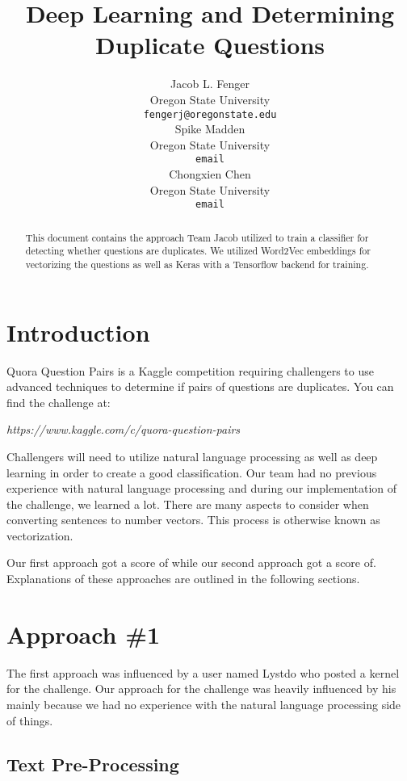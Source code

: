 \documentclass{article}
\title{Deep Learning and Determining Duplicate Questions}
\author{
  Jacob L. Fenger\\
  Oregon State University\\
  \texttt{fengerj@oregonstate.edu} \\
  \And
  Spike Madden \\
  Oregon State University\\
  \texttt{email} \\
  \AND
  Chongxien Chen \\
  Oregon State University\\
  \texttt{email} \\
}
\begin{document}

\maketitle

\begin{abstract}
  This document contains the approach Team Jacob utilized to train a classifier
  for detecting whether questions are duplicates. We utilized Word2Vec embeddings
  for vectorizing the questions as well as Keras with a Tensorflow backend
  for training.
\end{abstract}

\section{Introduction}

Quora Question Pairs is a Kaggle competition requiring challengers to use
advanced techniques to determine if pairs of questions are duplicates. You
can find the challenge at:
\begin{center}
\textit{https://www.kaggle.com/c/quora-question-pairs}
\end{center}

Challengers will need to utilize natural language processing as well as
deep learning in order to create a good classification. Our team had no
previous experience with natural language processing and during our
implementation of the challenge, we learned a lot. There are many aspects
to consider when converting sentences to number vectors. This process is
otherwise known as vectorization.

Our first approach got a score of  while our second approach got a score
of. Explanations of these approaches are outlined in the following
sections.

\section{Approach \#1}

The first approach was influenced by a user named Lystdo who posted a kernel
for the challenge. Our approach for the challenge was heavily influenced by
his mainly because we had no experience with the natural language processing
side of things.

\subsection{Text Pre-Processing}
\end{document}
